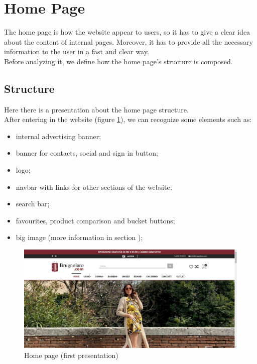 \section{Home Page}
The home page is how the website appear to users, so it has to give a clear
idea about the content of internal pages. Moreover, it has to provide all
the necessary information to the user in a fast and clear way.\\
Before analyzing it, we define how the home page's structure is composed.

\subsection{Structure}
Here there is a presentation about the home page structure.\\
After entering in the website (figure \ref{home-page-no-scroll}), we can
recognize some elements such as:
\begin{itemize}
    \item internal advertising banner;
    \item banner for contacts, social and sign in button;
    \item logo;
    \item navbar with links for other sections of the website;
    \item search bar;
    \item favourites, product comparison and bucket buttons;
    \item big image (more information in section );
\end{itemize}
\newpage
\vspace*{\fill}
\begin{figure}[!h] 
    \centering 
    \includegraphics[scale = 0.29]{images/hp_scroll0.png} 
    \caption{Home page (first presentation)}
    \label{home-page-no-scroll}
\end{figure}
\vspace*{\fill}
